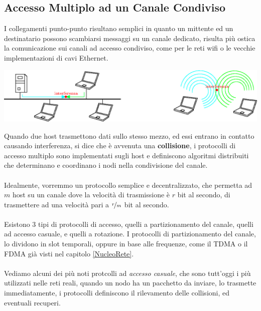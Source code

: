 \documentclass[12pt, letterpaper]{article}
\newcommand{\acc}{\\\hphantom{}\\}
\begin{document}
\subsection{Accesso Multiplo ad un Canale Condiviso}
I collegamenti punto-punto risultano semplici in quanto un mittente ed un destinatario possono scambiarsi messaggi 
su un canale dedicato, risulta più ostica la comunicazione sui canali ad accesso condiviso, come per le reti wifi o le 
vecchie implementazioni di cavi Ethernet.\begin{center}
    \includegraphics[width=1\textwidth ]{images/AccessoMultiplo.eps}
\end{center} 
Quando due host trasmettono dati sullo stesso mezzo, ed essi entrano in contatto causando interferenza, si dice 
che è avvenuta una \textbf{collisione}, i protocolli di accesso multiplo sono implementati sugli host e definiscono 
algoritmi distribuiti che determinano e coordinano i nodi nella condivisione del canale.\acc 
Idealmente, vorremmo un protocollo semplice e decentralizzato, che permetta ad $m$ host su un canale dove la velocità 
di trasmissione è $r$ bit al secondo, di trasmettere ad una velocità pari a $\nicefrac{r}{m}$ bit al secondo.\acc 
Esistono 3 tipi di protocolli di accesso, quelli a partizionamento del canale, quelli ad accesso casuale, e quelli a rotazione. 
I protocolli di partizionamento del canale, lo dividono in slot temporali, oppure in base alle frequenze, come il 
TDMA o il FDMA già visti nel capitolo \ref{NucleoRete}.\acc 
Vediamo alcuni dei più noti protcolli ad \textit{accesso casuale}, che sono tutt'oggi i più utilizzati nelle 
reti reali, quando un nodo ha un pacchetto da inviare, lo trasmette immediatamente, i protocolli definiscono 
il rilevamento delle collisioni, ed eventuali recuperi.
\end{document}
